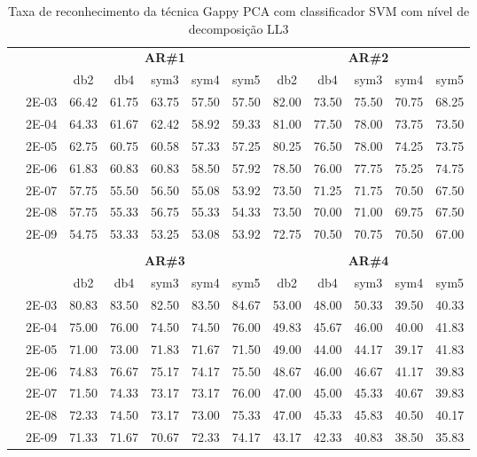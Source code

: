\begin{table}[H]
	\centering
    \normalsize
	\caption{Taxa de reconhecimento da técnica Gappy PCA com classificador SVM com nível de decomposição LL3}
	\begin{tabular}{|c|c|c c c c c|c c c c c|}
\cline{3-12}
\multicolumn{2}{c|}{\multirow{2}{*}{}} & \multicolumn{5}{c|}{\textbf{AR\#1}}  & \multicolumn{5}{c|}{\textbf{AR\#2}} \\\cline{3-12}

\multicolumn{2}{c|}{}  & db2 & db4 & sym3 & sym4 & sym5 & db2 & db4& sym3 & sym4 & sym5 \\\hline
\multicolumn{1}{|c|}{ \multirow{6}{*}{\rotatebox[origin=c]{90}{\textbf{Gamma}}} }
&2E-03&	66.42&	61.75&	63.75&	57.50&	57.50&	82.00	&73.50&	75.50&	70.75&	68.25	\\\cline{2-12}
&2E-04&	64.33&	61.67&	62.42&	58.92&	59.33&	81.00	&77.50&	78.00&	73.75&	73.50	\\\cline{2-12}
&2E-05&	62.75&	60.75&	60.58&	57.33&	57.25&	80.25	&76.50&	78.00&	74.25&	73.75	\\\cline{2-12}
&2E-06&	61.83&	60.83&	60.83&	58.50&	57.92&	78.50	&76.00&	77.75&	75.25&	74.75	\\\cline{2-12}
&2E-07&	57.75&	55.50&	56.50&	55.08&	53.92&	73.50	&71.25&	71.75&	70.50&	67.50	\\\cline{2-12}
&2E-08&	57.75&	55.33&	56.75&	55.33&	54.33&	73.50	&70.00&	71.00&	69.75&	67.50	\\\cline{2-12}
&2E-09&	54.75&	53.33&	53.25&	53.08&	53.92&	72.75	&70.50&	70.75&	70.50&	67.00	
	


\\ \midrule
\multicolumn{12}{c}{}\\ 

\cline{3-12}
\multicolumn{2}{c}{} & \multicolumn{5}{|c|}{\textbf{AR\#3}}  & \multicolumn{5}{c|}{\textbf{AR\#4}} \\\cline{3-12}
\multicolumn{2}{c}{}  & \multicolumn{1}{|c}{db2} & db4 & sym3 & sym4 & sym5 & db2 & db4& sym3 & sym4 & sym5 \\\hline
\multicolumn{1}{|c|}{ \multirow{6}{*}{\rotatebox[origin=c]{90}{\textbf{Gamma}}} }
&2E-03&	80.83&	83.50&	82.50&	83.50&	84.67&	53.00	&48.00&	50.33&	39.50&	40.33	\\\cline{2-12}
&2E-04&	75.00&	76.00&	74.50&	74.50&	76.00&	49.83	&45.67&	46.00&	40.00&	41.83	\\\cline{2-12}
&2E-05&	71.00&	73.00&	71.83&	71.67&	71.50&	49.00	&44.00&	44.17&	39.17&	41.83	\\\cline{2-12}
&2E-06&	74.83&	76.67&	75.17&	74.17&	75.50&	48.67	&46.00&	46.67&	41.17&	39.83	\\\cline{2-12}
&2E-07&	71.50&	74.33&	73.17&	73.17&	76.00&	47.00	&45.00&	45.33&	40.67&	39.83	\\\cline{2-12}
&2E-08&	72.33&	74.50&	73.17&	73.00&	75.33&	47.00	&45.33&	45.83&	40.50&	40.17	\\\cline{2-12}
&2E-09&	71.33&	71.67&	70.67&	72.33&	74.17&	43.17	&42.33&	40.83&	38.50&	35.83	
	

\end{tabular}
\end{table}
